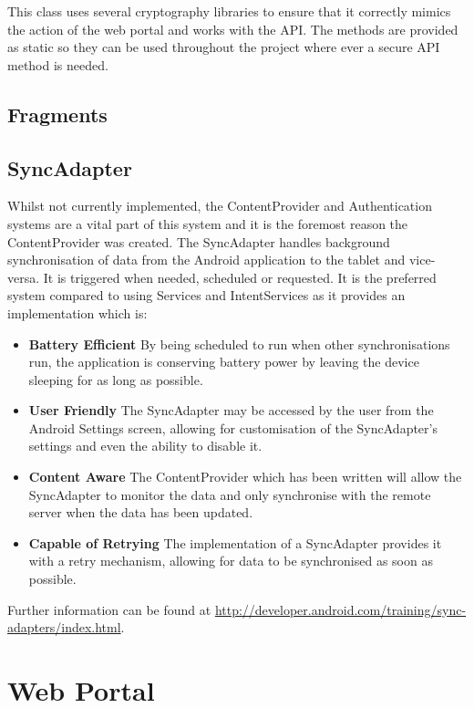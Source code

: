 \documentclass[11pt,a4paper]{article}
\begin{document}
This class uses several cryptography libraries to ensure that it correctly mimics the action of the web portal and works with the API. The methods are provided as static so they can be used throughout the project where ever a secure API method is needed. 

\subsection{Fragments}
\label{sec:fragments}

\subsection{SyncAdapter}
\label{sec:syncAdapter}
Whilst not currently implemented, the ContentProvider and Authentication systems are a vital part of this system and it is the foremost reason the ContentProvider was created. The SyncAdapter handles background synchronisation of data from the Android application to the tablet and vice-versa. It is triggered when needed, scheduled or requested. It is the preferred system compared to using Services and IntentServices as it provides an implementation which is:
\begin{itemize}
\item \textbf{Battery Efficient} By being scheduled to run when other synchronisations run, the application is conserving battery power by leaving the device sleeping for as long as possible.
\item \textbf{User Friendly} The SyncAdapter may be accessed by the user from the Android Settings screen, allowing for customisation of the SyncAdapter's settings and even the ability to disable it.
\item \textbf{Content Aware} The ContentProvider which has been written will allow the SyncAdapter to monitor the data and only synchronise with the remote server when the data has been updated.
\item \textbf{Capable of Retrying} The implementation of a SyncAdapter provides it with a retry mechanism, allowing for data to be synchronised as soon as possible.
\end{itemize}

Further information can be found at \url{http://developer.android.com/training/sync-adapters/index.html}.


\section{Web Portal}
\end{document}
